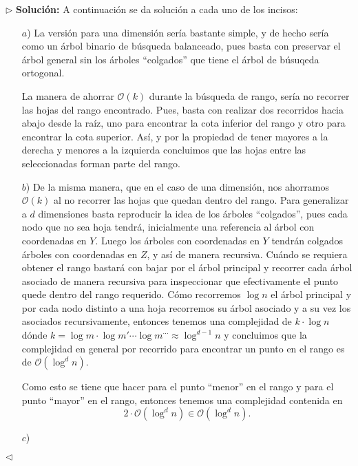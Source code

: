 $\rhd$ \textbf{Solución:} A continuación se da solución a cada uno de los incisos:
\begin{enumerate}
\item[$a$)] La versión para una dimensión sería bastante simple, y de hecho sería
  como un árbol binario de búsqueda balanceado, pues basta con preservar el árbol
  general sin los árboles ``colgados'' que tiene el árbol de búsuqeda ortogonal.
  \newline
  
  La manera de ahorrar $\mathcal{O}(k)$ durante la búsqueda de rango, sería no recorrer las
  hojas del rango encontrado. Pues, basta con realizar dos recorridos hacia abajo desde la
  raíz, uno para encontrar la cota inferior del rango y otro para encontrar la cota superior.
  Así, y por la propiedad de tener mayores a la derecha y menores a la izquierda concluimos
  que las hojas entre las seleccionadas forman parte del rango.
\item[$b$)] De la misma manera, que en el caso de una dimensión, nos ahorramos $\mathcal{O}(k)$
  al no recorrer las hojas que quedan dentro del rango. Para generalizar a $d$ dimensiones basta
  reproducir la idea de los árboles ``colgados'', pues cada nodo que no sea hoja tendrá, inicialmente
  una referencia al árbol con coordenadas en $Y$. Luego los árboles con coordenadas en $Y$ tendrán
  colgados árboles con coordenadas en $Z$, y así de manera recursiva. Cuándo se requiera obtener
  el rango bastará con bajar por el árbol principal y recorrer cada árbol asociado de manera
  recursiva para inspeccionar que efectivamente el punto quede dentro del rango requerido.
  Cómo recorremos $\log n$ el árbol principal y por cada nodo distinto a una hoja recorremos
  su árbol asociado y a su vez los asociados recursivamente, entonces tenemos una complejidad
  de $k \cdot \log n$ dónde $k = \log m \cdot \log m' \dotsm \log m^{\dotsm} \approx \log^{d - 1} n$
  y concluimos que la complejidad en general por recorrido para encontrar un punto en el rango
  es de $\mathcal{O}(\log^d n)$.\newline
  
  Como esto se tiene que hacer para el punto ``menor'' en el rango y para el punto ``mayor''
  en el rango,  entonces tenemos una complejidad contenida en
  \[2 \cdot \mathcal{O}(\log^d n) \in \mathcal{O}(\log^d n).\]
\item[$c$)] 
\end{enumerate}
\hfill $\lhd$
